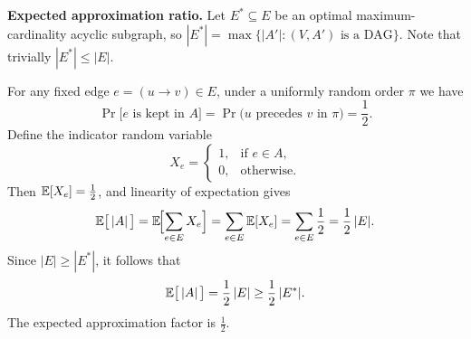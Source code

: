 \documentclass[11pt]{article}
\begin{document}
\begin{description}
\begin{enumerate}
\textbf{Expected approximation ratio.}
Let \(E^*\subseteq E\) be an optimal maximum-cardinality acyclic subgraph, so \(|E^*| = \max\{|A'| : (V,A')\text{ is a DAG}\}\).  Note that trivially \(|E^*|\le |E|\).

For any fixed edge \(e=(u\to v)\in E\), under a uniformly random order \(\pi\) we have
\[
\Pr\bigl[e\text{ is kept in }A\bigr]
=\Pr\bigl(u\text{ precedes }v \text{ in }\pi\bigr)
=\frac12.
\]
Define the indicator random variable
\[
X_e =
\begin{cases}
1,&\text{if }e\in A,\\
0,&\text{otherwise.}
\end{cases}
\]
Then \(\mathbb{E}[X_e]=\frac12\), and linearity of expectation gives
\[
\mathbb{E}\bigl[\,|A|\,\bigr]
=\mathbb{E}\!\Bigl[\sum_{e\in E}X_e\Bigr]
=\sum_{e\in E}\mathbb{E}[X_e]
=\sum_{e\in E}\frac12
=\frac12\,|E|.
\]
Since \(|E|\ge|E^*|\), it follows that
\[
\mathbb{E}\bigl[\,|A|\,\bigr]
=\frac12\,|E|
\ge \frac12\,|E^*|.
\]
The expected approximation factor is \(\frac12\).

\end{enumerate}

\end{description}
\end{document}
